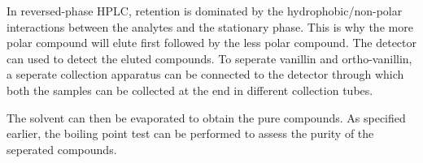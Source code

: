 \documentclass[letterpaper,12pt]{article}
\begin{document}
In reversed-phase HPLC, retention is dominated by the hydrophobic/non-polar interactions between the analytes and the stationary phase. This is why the more polar compound will elute first followed by the less polar compound. The detector can used to detect the eluted compounds. To seperate vanillin and ortho-vanillin, a seperate collection apparatus can be connected to the detector through which both the samples can be collected at the end in different collection tubes.

The solvent can then be evaporated to obtain the pure compounds. As specified earlier, the boiling point test can be performed to assess the purity of the seperated compounds.
\end{document}
